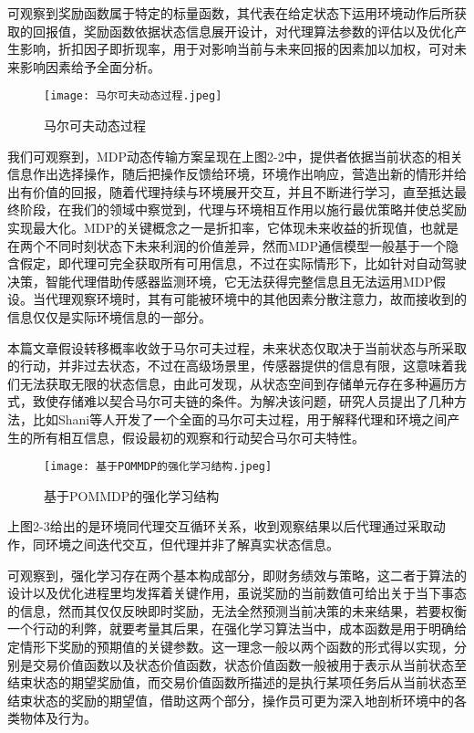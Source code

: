 可观察到奖励函数属于特定的标量函数，其代表在给定状态下运用环境动作后所获取的回报值，奖励函数依据状态信息展开设计，对代理算法参数的评估以及优化产生影响，折扣因子即折现率，用于对影响当前与未来回报的因素加以加权，可对未来影响因素给予全面分析。

\begin{figure}[hbt]
	\centering
	\texttt{[image: 马尔可夫动态过程.jpeg]}
	\caption{马尔可夫动态过程}
	\label{f.example}
\end{figure}

我们可观察到，MDP动态传输方案呈现在上图2-2中，提供者依据当前状态的相关信息作出选择操作，随后把操作反馈给环境，环境作出响应，营造出新的情形并给出有价值的回报，随着代理持续与环境展开交互，并且不断进行学习，直至抵达最终阶段，在我们的领域中察觉到，代理与环境相互作用以施行最优策略并使总奖励实现最大化。MDP的关键概念之一是折扣率，它体现未来收益的折现值，也就是在两个不同时刻状态下未来利润的价值差异，然而MDP通信模型一般基于一个隐含假定，即代理可完全获取所有可用信息，不过在实际情形下，比如针对自动驾驶决策，智能代理借助传感器监测环境，它无法获得完整信息且无法运用MDP假设。当代理观察环境时，其有可能被环境中的其他因素分散注意力，故而接收到的信息仅仅是实际环境信息的一部分。

本篇文章假设转移概率收敛于马尔可夫过程，未来状态仅取决于当前状态与所采取的行动，并非过去状态，不过在高级场景里，传感器提供的信息有限，这意味着我们无法获取无限的状态信息，由此可发现，从状态空间到存储单元存在多种遍历方式，致使存储难以契合马尔可夫链的条件。为解决该问题，研究人员提出了几种方法，比如Shani\cite{shani2013survey}等人开发了一个全面的马尔可夫过程，用于解释代理和环境之间产生的所有相互信息，假设最初的观察和行动契合马尔可夫特性。

\begin{figure}[hbt]
	\centering
	\texttt{[image: 基于POMMDP的强化学习结构.jpeg]}
	\caption{基于POMMDP的强化学习结构}
	\label{f.example}
\end{figure}

上图2-3给出的是环境同代理交互循环关系，收到观察结果以后代理通过采取动作，同环境之间迭代交互，但代理并非了解真实状态信息。



可观察到，强化学习存在两个基本构成部分，即财务绩效与策略，这二者于算法的设计以及优化进程里均发挥着关键作用，虽说奖励的当前数值可给出关于当下事态的信息，然而其仅仅反映即时奖励，无法全然预测当前决策的未来结果，若要权衡一个行动的利弊，就要考量其后果，在强化学习算法当中，成本函数是用于明确给定情形下奖励的预期值的关键参数。这一理念一般以两个函数的形式得以实现，分别是交易价值函数以及状态价值函数，状态价值函数一般被用于表示从当前状态至结束状态的期望奖励值，而交易价值函数所描述的是执行某项任务后从当前状态至结束状态的奖励的期望值，借助这两个部分，操作员可更为深入地剖析环境中的各类物体及行为。

